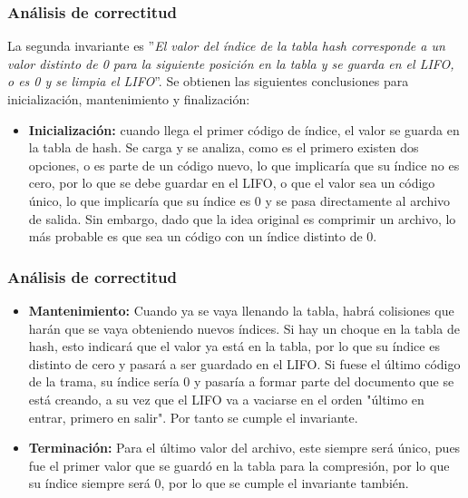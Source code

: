 \documentclass{beamer}
\begin{document}

	\begin{frame}
		\frametitle{Análisis de correctitud}
		La segunda invariante es ''\textit{El valor del índice de la tabla hash corresponde a un valor distinto de 0 para la siguiente posición en la tabla y se guarda en el LIFO, o es 0 y se limpia el LIFO}''. Se obtienen las siguientes conclusiones para inicialización, mantenimiento y finalización:
		
		\begin{itemize}
			\item \textbf{Inicialización:} cuando llega el primer código de índice, el valor se guarda en la tabla de hash. Se carga y se analiza, como es el primero existen dos opciones, o es parte de un código nuevo, lo que implicaría que su índice no es cero, por lo que se debe guardar en el LIFO, o que el valor sea un código único, lo que implicaría que su índice es 0 y se pasa directamente al archivo de salida. Sin embargo, dado que la idea original es comprimir un archivo, lo más probable es que sea un código con un índice distinto de 0.

		\end{itemize}				
		
	\end{frame}
	
	\begin{frame}
	\frametitle{Análisis de correctitud}
		\begin{itemize}
			\item \textbf{Mantenimiento:}  Cuando ya se vaya llenando la tabla, habrá colisiones que harán que se vaya obteniendo nuevos índices. Si hay un choque en la tabla de hash, esto indicará que el valor ya está en la tabla, por lo que su índice es distinto de cero y pasará a ser guardado en el LIFO. Si fuese el último código de la trama, su índice sería 0 y pasaría a formar parte del documento que se está creando, a su vez que el LIFO va a vaciarse en el orden "último en entrar, primero en salir". Por tanto se cumple el invariante.



			\item \textbf{Terminación:} Para el último valor del archivo, este siempre será único, pues fue el primer valor que se guardó en la tabla para la compresión, por lo que su índice siempre será 0, por lo que se cumple el invariante también.


		\end{itemize}			
	
	\end{frame}		
\end{document}
